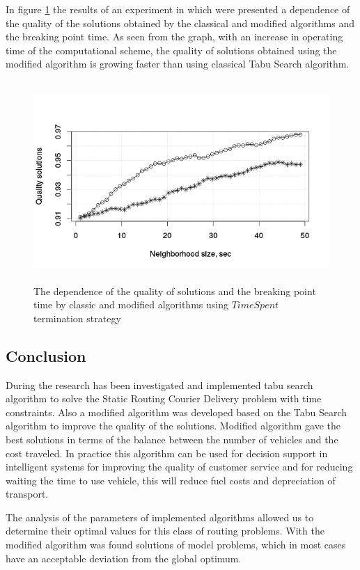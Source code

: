 \documentclass[]{TAACpaper}
\begin{document}
 In figure \ref{aba:fig5} the results of an experiment in which  were presented a dependence of the quality of the solutions obtained by the classical and modified algorithms and  the breaking point time. As seen from the graph, with an increase in operating time of the computational scheme, the quality of solutions obtained using the modified algorithm is growing faster than using classical Tabu Search algorithm.
 
 \begin{figure}[h]
 	\hfil\includegraphics[height=3.0in]{images/tabu_mod.png}\hfil
 	\caption
 	{
 		The dependence of the quality of solutions and  the breaking point time by classic and modified algorithms using $ TimeSpent $ termination strategy
 	}
 	\label{aba:fig5}
 \end{figure}
 
 
\subsection{Conclusion}
During the research has been investigated and implemented tabu search algorithm to solve the Static Routing Courier Delivery problem with time constraints. Also a modified algorithm was developed  based on the Tabu Search algorithm to improve the quality of the solutions. Modified algorithm gave the best solutions in terms of the balance between the number of vehicles and the cost traveled.  In practice this algorithm can be used for decision support in intelligent systems for improving the quality of customer service and for reducing waiting the time to use vehicle, this will reduce fuel costs and depreciation of transport.

The analysis of the parameters of implemented algorithms allowed us to determine their optimal values for this class of routing problems. With the modified algorithm was found solutions of model problems, which in most cases have an acceptable deviation from the global optimum.
\end{document}

